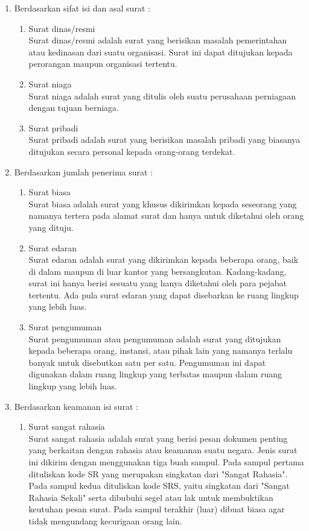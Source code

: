 \begin{enumerate}
\begin{enumerate}
	\end{enumerate}
	\item Berdasarkan sifat isi dan asal surat :
	\begin{enumerate}
		\item Surat dinas/resmi \\
		Surat dinas/resmi adalah surat yang berisikan masalah pemerintahan atau kedinasan dari suatu organisasi. Surat ini dapat ditujukan kepada perorangan maupun organisasi tertentu. 
		\item Surat niaga \\
		Surat niaga adalah surat yang ditulis oleh suatu perusahaan perniagaan dengan tujuan berniaga. 
		\item Surat pribadi \\
		Surat pribadi adalah surat yang berisikan masalah pribadi yang biasanya ditujukan secara personal kepada orang-orang terdekat.
	\end{enumerate}
	\item Berdasarkan jumlah penerima surat :
	\begin{enumerate}
		\item Surat biasa \\
		Surat biasa adalah surat yang khusus dikirimkan kepada seseorang yang namanya tertera pada alamat surat dan hanya untuk diketahui oleh orang yang dituju.
		\item Surat edaran \\
		Surat edaran adalah surat yang dikirimkan kepada beberapa orang, baik di dalam maupun di luar kantor yang bersangkutan. Kadang-kadang, surat ini hanya berisi sesuatu yang hanya diketahui oleh para pejabat tertentu. Ada pula surat edaran yang dapat disebarkan ke ruang lingkup yang lebih luas.
		\item Surat pengumuman \\
		Surat pengumuman atau pengumuman adalah surat yang ditujukan kepada beberapa orang, instansi, atau pihak lain yang namanya terlalu banyak untuk disebutkan satu per satu. Pengumuman ini dapat digunakan dalam ruang lingkup yang terbatas maupun dalam ruang lingkup yang lebih luas. 
	\end{enumerate}
	\item Berdasarkan keamanan isi surat :
	\begin{enumerate}
		\item Surat sangat rahasia \\
		Surat sangat rahasia adalah surat yang berisi pesan dokumen penting yang berkaitan dengan rahasia atau keamanan suatu negara. Jenis surat ini dikirim dengan menggunakan tiga buah sampul. Pada sampul pertama dituliskan kode SR yang merupakan singkatan dari "Sangat Rahasia". Pada sampul kedua dituliskan kode SRS, yaitu singkatan dari "Sangat Rahasia Sekali" serta dibubuhi segel atau lak untuk membuktikan keutuhan pesan surat. Pada sampul terakhir (luar) dibuat biasa agar tidak mengundang kecurigaan orang lain. 

\end{enumerate}
\end{enumerate}
